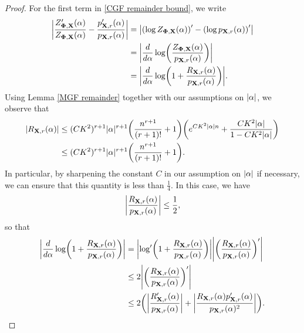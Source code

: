 \documentclass[final,12pt]{colt2018} %
\numberwithin{equation}{section}
\DeclarePairedDelimiter{\abs}{\lvert}{\rvert}
\DeclarePairedDelimiter{\paren}{(}{)}
\newcommand{\boldPhi}{\boldsymbol{\Phi}}
\newcommand{\boldX}{\textbf{X}}
\begin{document}
\begin{proof}
	For the first term in \eqref{CGF remainder bound}, we write
	\begin{align} \label{CGF Taylor deviation}
	\abs*{\frac{Z_{\boldPhi,\boldX}'(\alpha)}{Z_{\boldPhi,\boldX}(\alpha)} - \frac{p_{\boldX,r}'(\alpha)}{p_{\boldX,r}(\alpha)}} & = \abs*{\paren*{\log Z_{\boldPhi,\boldX}(\alpha)}'- \paren*{\log p_{\boldX,r}(\alpha)}'} \nonumber \\
	& = \abs*{\frac{d}{d\alpha} \log\paren*{\frac{Z_{\boldPhi,\boldX}(\alpha)}{p_{\boldX,r}(\alpha)}} } \nonumber \\
	& = \abs*{\frac{d}{d\alpha} \log\paren*{1+\frac{R_{\boldX,r}(\alpha)}{p_{\boldX,r}(\alpha)}} }.
	\end{align}
	Using Lemma \ref{MGF remainder} together with our assumptions on $\abs{\alpha}$, we observe that
	\begin{align} \label{Taylor remainder bound}
	\abs{R_{\boldX,r}(\alpha)} & \leq (CK^2)^{r+1}\abs{\alpha}^{r+1}\paren*{\frac{n^{r+1}}{(r+1)!}+1} \paren*{e^{CK^2\abs{\alpha} n} + \frac{CK^2\abs{\alpha}}{1-CK^2\abs{\alpha}}} \nonumber \\
	& \leq (CK^2)^{r+1}\abs{\alpha}^{r+1}\paren*{\frac{n^{r+1}}{(r+1)!}+1}.
	\end{align}
	In particular, by sharpening the constant $C$ in our assumption on $\abs{\alpha}$ if necessary, we can ensure that this quantity is less than $\frac{1}{4}$. In this case, we have
	\[
	\abs*{\frac{R_{\boldX,r}(\alpha)}{p_{\boldX,r}(\alpha)}} \leq \frac{1}{2},
	\]
	so that
	\begin{align} \label{log derivative bound}
	\abs*{\frac{d}{d\alpha} \log\paren*{1+\frac{R_{\boldX,r}(\alpha)}{p_{\boldX,r}(\alpha)}} } & = \abs*{\log'\paren*{1+\frac{R_{\boldX,r}(\alpha)}{p_{\boldX,r}(\alpha)}} }\abs*{\paren*{\frac{R_{\boldX,r}(\alpha)}{p_{\boldX,r}(\alpha)}}'} \nonumber \\
	& \leq 2\abs*{\paren*{\frac{R_{\boldX,r}(\alpha)}{p_{\boldX,r}(\alpha)}}'} \nonumber \\
	& \leq 2 \paren*{\abs*{\frac{R_{\boldX,r}'(\alpha)}{p_{\boldX,r}(\alpha)}} + \abs*{\frac{R_{\boldX,r}(\alpha)p_{\boldX,r}'(\alpha)}{p_{\boldX,r}(\alpha)^2}}}.
	\end{align}
	

\end{proof}
\end{document}
